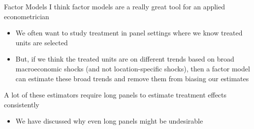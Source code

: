 \documentclass[t]{beamer}
\begin{document}
\begin{frame}{Factor Models}
  I think factor models are a really great tool for an applied econometrician
  \begin{itemize}
    \item We often want to study treatment in panel settings where we know treated units are selected
    \item But, if we think the treated units are on different trends based on broad macroeconomic shocks (and not location-specific shocks), then a factor model can estimate these broad trends and remove them from biasing our estimates
  \end{itemize}

  \bigskip
  A lot of these estimators require long panels to estimate treatment effects consistently
  \begin{itemize}
    \item We have discussed why even long panels might be undesirable
  \end{itemize}
\end{frame}
\end{document}

